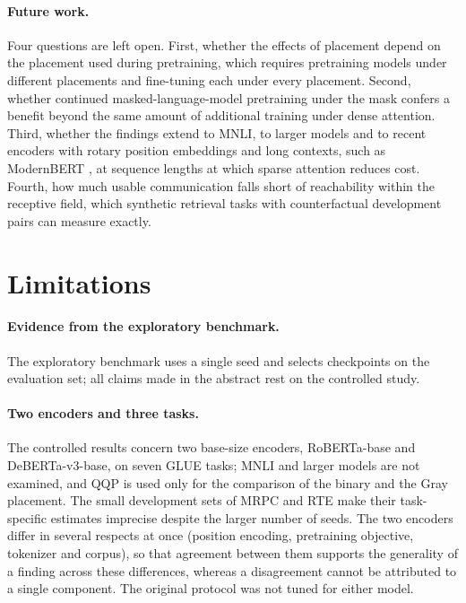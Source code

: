 \documentclass[10pt]{article}
\begin{document}
\paragraph{Future work.} Four questions are left open. First, whether the effects of placement depend on the placement used during pretraining, which requires pretraining models under different placements and fine-tuning each under every placement. Second, whether continued masked-language-model pretraining under the mask confers a benefit beyond the same amount of additional training under dense attention. Third, whether the findings extend to MNLI, to larger models and to recent encoders with rotary position embeddings and long contexts, such as ModernBERT \citep{warner2024modernbert}, at sequence lengths at which sparse attention reduces cost. Fourth, how much usable communication falls short of reachability within the receptive field, which synthetic retrieval tasks with counterfactual development pairs can measure exactly.

\section{Limitations}
\label{sec:limits}

\paragraph{Evidence from the exploratory benchmark.} The exploratory benchmark uses a single seed and selects checkpoints on the evaluation set; all claims made in the abstract rest on the controlled study.

\paragraph{Two encoders and three tasks.} The controlled results concern two base-size encoders, RoBERTa-base and DeBERTa-v3-base, on seven GLUE tasks; MNLI and larger models are not examined, and QQP is used only for the comparison of the binary and the Gray placement. The small development sets of MRPC and RTE make their task-specific estimates imprecise despite the larger number of seeds. The two encoders differ in several respects at once (position encoding, pretraining objective, tokenizer and corpus), so that agreement between them supports the generality of a finding across these differences, whereas a disagreement cannot be attributed to a single component. The original protocol was not tuned for either model.
\end{document}
